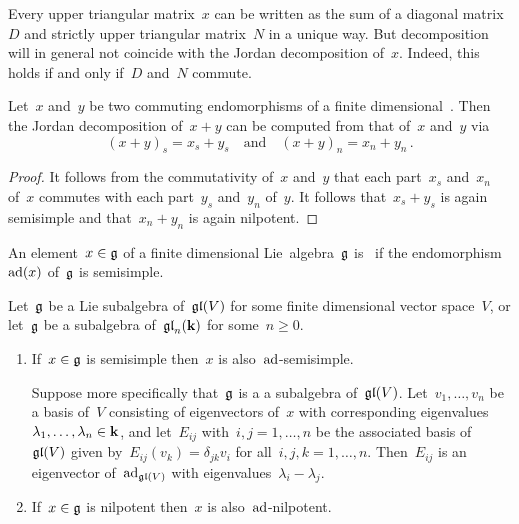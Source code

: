 \begin{warning}
  Every upper triangular matrix~$x$ can be written as the sum of a diagonal matrix~$D$ and strictly upper triangular matrix~$N$ in a unique way.
  But decomposition will in general not coincide with the Jordan decomposition of~$x$.
  Indeed, this holds if and only if~$D$ and~$N$ commute.
\end{warning}


\begin{lemma}
  \label{concrete jordan decomposition of sum}
  Let~$x$ and~$y$ be two commuting endomorphisms of a finite dimensional~{\vectorspace{$\kf$}}.
  Then the Jordan decomposition of~$x+y$ can be computed from that of~$x$ and~$y$ via
  \[
    (x + y)_s
    =
    x_s + y_s
    \quad\text{and}\quad
    (x + y)_n
    =
    x_n + y_n \,.
  \]
\end{lemma}


\begin{proof}
  It follows from the commutativity of~$x$ and~$y$ that each part~$x_s$ and~$x_n$ of~$x$ commutes with each part~$y_s$ and~$y_n$ of~$y$.
  It follows that~$x_s + y_s$ is again semisimple and that~$x_n + y_n$ is again nilpotent.
\end{proof}


\begin{definition}
  An element~$x \in \mathfrak{g}$ of a finite dimensional Lie~algebra~$\mathfrak{g}$ is~ if the endomorphism~$\operatorname{ad}(x)$ of~$\mathfrak{g}$ is semisimple.
\end{definition}


\begin{lemma}
  \label{ss and nilpotent implies ad-ss and ad-nilpotent}
  Let~$\mathfrak{g}$ be a Lie subalgebra of~$\mathfrak{gl}(V)$ for some finite dimensional vector space~$V$, or let~$\mathfrak{g}$ be a subalgebra of~$\mathfrak{gl}_n(\mathbf{k})$ for some~$n \geq 0$.
  \begin{enumerate}
    \item
      If~$x \in \mathfrak{g}$ is semisimple then~$x$ is also~$\operatorname{ad}$-semisimple.
      
      Suppose more specifically that~$\mathfrak{g}$ is a a subalgebra of~$\mathfrak{gl}(V)$.
      Let~$v_1, \dotsc, v_n$ be a basis of~$V$ consisting of eigenvectors of~$x$ with corresponding eigenvalues~$\lambda_1, \dotsc, \lambda_n \in \mathbf{k}$, and let~$E_{ij}$ with~$i,j = 1, \dotsc, n$ be the associated basis of~$\mathfrak{gl}(V)$ given by~$E_{ij}(v_k) = \delta_{jk} v_i$ for all~$i,j,k = 1, \dotsc, n$.
      Then~$E_{ij}$ is an eigenvector of~$\operatorname{ad}_{\mathfrak{gl}(V)}$ with eigenvalues~$\lambda_i - \lambda_j$.
    \item
      If~$x \in \mathfrak{g}$ is nilpotent then~$x$ is also~$\operatorname{ad}$-nilpotent.
  \end{enumerate}
\end{lemma}


